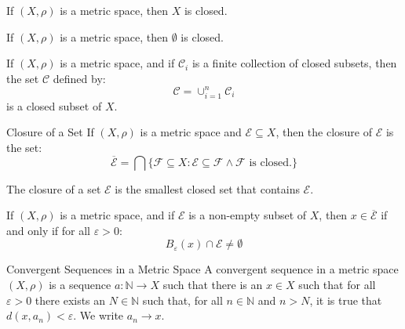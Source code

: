 \documentclass[crop=false,class=article,oneside]{standalone}
\begin{document}
            \begin{theorem}
                If $(X,\rho)$ is a metric space, then $X$ is closed.
            \end{theorem}
            \begin{theorem}
                If $(X,\rho)$ is a metric space, then
                $\emptyset$ is closed.
            \end{theorem}
            \begin{theorem}
                If $(X,\rho)$ is a metric space, and if
                $\mathcal{C}_{i}$ is a finite collection of
                closed subsets, then the set
                $\mathcal{C}$ defined by:
                \begin{equation}
                    \mathcal{C}=\cup_{i=1}^{n}\mathcal{C}_{i}
                \end{equation}
                is a closed subset of $X$.
            \end{theorem}
            \begin{ldefinition}{Closure of a Set}
                If $(X,\rho)$ is a metric space and
                $\mathcal{E}\subseteq{X}$, then the closure
                of $\mathcal{E}$ is the set:
                \begin{equation}
                    \overline{\mathcal{E}}=
                    \bigcap\{\mathcal{F}\subseteq{X}:
                        \mathcal{E}\subseteq\mathcal{F}
                        \land\mathcal{F}\textrm{ is closed.}\}
                \end{equation}
            \end{ldefinition}
            The closure of a set $\mathcal{E}$ is the
            smallest closed set that contains $\mathcal{E}$.
            \begin{theorem}
                If $(X,\rho)$ is a metric space, and if
                $\mathcal{E}$ is a non-empty subset of $X$, then
                $x\in\overline{\mathcal{E}}$ if and only if for
                all $\varepsilon>0$:
                \begin{equation}
                    B_{\varepsilon}(x)\cap\mathcal{E}\ne\emptyset
                \end{equation}
            \end{theorem}
            \begin{ldefinition}
                  {Convergent Sequences in a Metric Space}
                A convergent sequence in a metric space
                $(X,\rho)$ is a sequence
                $a:\mathbb{N}\rightarrow{X}$ such that there is
                an $x\in{X}$ such that for all $\varepsilon>0$
                there exists an $N\in\mathbb{N}$ such that, for
                all $n\in\mathbb{N}$ and $n>N$, it is true that
                $d(x,a_{n})<\varepsilon$. We write
                $a_{n}\rightarrow{x}$.
            \end{ldefinition}
\end{document}
